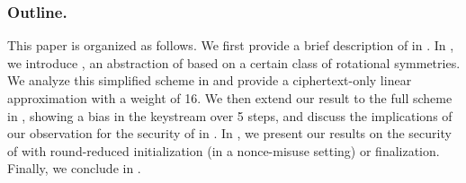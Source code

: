 \subsubsection*{Outline.}
This paper is organized as follows.
We first provide a brief description of \MORUS in .
In , we introduce \MiniMORUS, an abstraction of \MORUS based on a certain class of rotational symmetries.
We analyze this simplified scheme in  and provide a ciphertext-only linear approximation with a weight of 16.
We then extend our result to the full scheme in , showing a bias in the keystream over 5 steps,
and discuss the implications of our observation for the security of \MORUS in .
In , we present our results on the security of \MORUS with round-reduced initialization (in a nonce-misuse setting) or finalization.
Finally, we conclude in .

